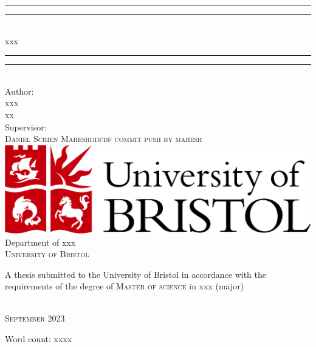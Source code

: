 \begin{titlepage}

\vspace*{13mm}

\begin{center}
\rule[0.5ex]{\linewidth}{2pt}\vspace*{-\baselineskip}\vspace*{3.2pt}
\rule[0.5ex]{\linewidth}{1pt}\\[\baselineskip]
{\LARGE xxx}\\[4mm]
\rule[0.5ex]{\linewidth}{1pt}\vspace*{-\baselineskip}\vspace{3.2pt}
\rule[0.5ex]{\linewidth}{2pt}\\

\vspace{6.5mm}
{\large Author: \\
\textsc{xxx}\\
\textsc{xx}}\\

\vspace{6.5mm}
{\large Supervisor: \\
\textsc{Daniel Schien Maheshddfdf commit push by mahesh }}\\

\vspace{11mm}
\includegraphics[scale=0.2]{logos/bristollogo_colour}\\
\vspace{6mm}
{\large Department of xxx\\
\vspace{6mm}
\textsc{University of Bristol}}\\
\vspace{6mm}
\begin{minipage}{10cm}
A thesis submitted to the University of Bristol in accordance with the requirements of the degree of \textsc{Master of science} in xxx (major)
\end{minipage}\\
\vspace{11mm}
{\large\textsc{September 2023}}
\vspace{11mm}
\end{center}

\begin{flushright}
{\small Word count: xxxx}
\end{flushright}

\end{titlepage}